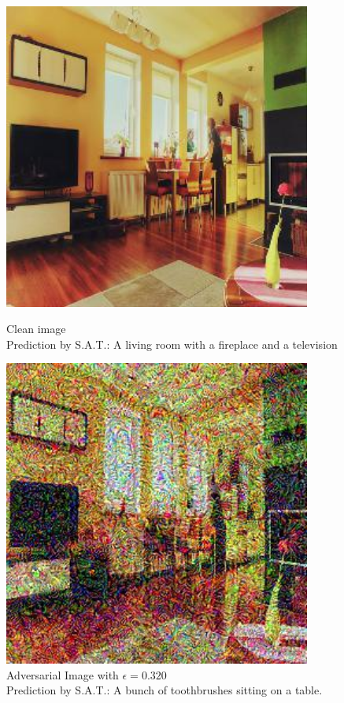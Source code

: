 \begin{figure}[ht]
    \centering
    \begin{minipage}{0.45\textwidth}
        \centering
        \includegraphics[width=0.9\textwidth]{../code/ShowDistractAndDeceive/samples/0.000/img_0.jpg} %
        \caption*{Clean image\\Prediction by S.A.T.: A living room with a fireplace and a television}
    \end{minipage}\hfill
    \begin{minipage}{0.45\textwidth}
        \centering
        \includegraphics[width=0.9\textwidth]{../code/ShowDistractAndDeceive/samples/0.640/img_0.jpg} %
        \caption*{Adversarial Image with $\epsilon=0.320$\\Prediction by S.A.T.: A bunch of toothbrushes sitting on a table.}
    \end{minipage}
\end{figure}
